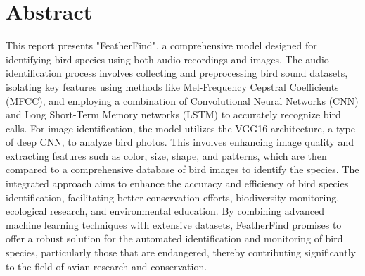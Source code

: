 \chapter*{Abstract}
This report presents "FeatherFind", a comprehensive model designed for
identifying bird species using both audio recordings and images. The audio
identification process involves collecting and preprocessing bird sound
datasets, isolating key features using methods like Mel-Frequency Cepstral
Coefficients (MFCC), and employing a combination of Convolutional Neural
Networks (CNN) and Long Short-Term Memory networks (LSTM) to accurately
recognize bird calls. For image identification, the model utilizes the VGG16
architecture, a type of deep CNN, to analyze bird photos. This involves
enhancing image quality and extracting features such as color, size, shape, and
patterns, which are then compared to a comprehensive database of bird images to
identify the species. The integrated approach aims to enhance the accuracy and
efficiency of bird species identification, facilitating better conservation
efforts, biodiversity monitoring, ecological research, and environmental
education. By combining advanced machine learning techniques with extensive
datasets, FeatherFind promises to offer a robust solution for the automated identification
and monitoring of bird species, particularly those that are endangered, thereby
contributing significantly to the field of avian research and conservation.


    {

        \KECadjusttocspacings %
        \makeatletter
        \def\@makeschapterhead#1{%
            {\newpage \parindent \z@ \raggedright \normalfont
                    \interlinepenalty\@M
                    \center\fontsize{16pt}{1} \bfseries
                    \MakeUppercase{#1}\par\nobreak
                    \vskip 18\p@ %
                }}
        \makeatother

        \tableofcontents %
        \listoffigures %
    }

